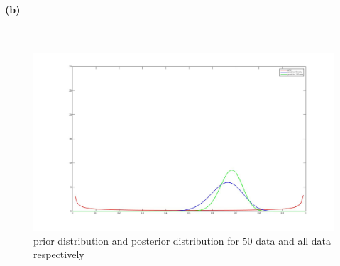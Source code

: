 \documentclass[]{article}
\begin{document}
						\paragraph*{(b)}\mbox{}\\
							\begin{figure}[H]
								\centering
								\includegraphics[width=1.2\linewidth]{3a2}
								\caption{prior distribution and posterior distribution for 50 data and all data respectively}
								\label{fig:3a2}
							\end{figure}
\end{document}
